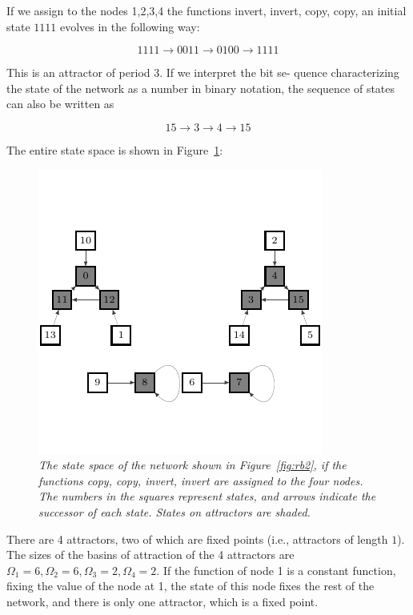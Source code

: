 If we assign to the nodes 1,2,3,4 the functions invert,
invert, copy, copy, an initial state $1111$ evolves in the
following way:

$$
1111 \to 0011 \to 0100 \to 1111
$$

This is an attractor of period 3. If we interpret the bit se-
quence characterizing the state of the network as a number in binary notation, the sequence of states can also be
written as

$$
15 \to 3 \to 4 \to 15
$$

The entire state space is shown in Figure~\ref{fig:rb3}:
\begin{figure}[h]
\centering
\includegraphics[scale=1.4]{fg3.pdf}
\caption{\emph{The state space of the network shown in Figure~\ref{fig:rb2}, if
the functions copy, copy, invert, invert are assigned to the four
nodes. The numbers in the squares represent states, and arrows indicate the successor of each state. States on attractors
are shaded.}}
\label{fig:rb3}
\end{figure}



There are 4 attractors, two of which are fixed points
(i.e., attractors of length $1$). The sizes of the basins of
attraction of the 4 attractors are $\Omega_1=6,\Omega_2= 6,\Omega_3 = 2,\Omega_4 = 2$. If the function
of node 1 is a constant function, fixing the value of the
node at 1, the state of this node fixes the rest of the
network, and there is only one attractor, which is a fixed
point.
